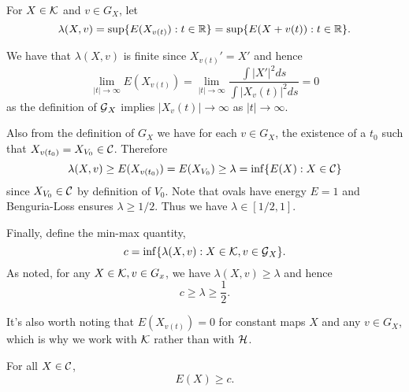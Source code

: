 \documentclass[12pt]{article}
\begin{document}
For \(X \in \operatorname{\mathcal{K}}\) and \(v \in G_X\), let
\[
\lambda(X, v) = \sup \lbrace E(X_{v(t)}) : t \in \operatorname{\mathbb{R}} \rbrace = \sup \lbrace E(X + v(t)) : t \in \operatorname{\mathbb{R}} \rbrace.
\]

We have that \(\lambda(X, v)\) is finite since \(X_{v(t)}' = X'\) and hence
\[
\lim_{|t| \to \infty} E(X_{v(t)}) = \lim_{|t| \to \infty} \frac{\int |X'|^2 ds}{\int |X_v(t)|^2 ds} = 0
\]
as the definition of \(\operatorname{\mathcal{G}}_X\) implies \(|X_v(t)| \to \infty\) as \(|t| \to \infty\).

Also from the definition of \(G_X\) we have for each \(v \in G_X\), the existence of a \(t_0\) such that \(X_{v(t_0)} = X_{V_0} \in \operatorname{\mathcal{C}}\). Therefore
\[
\lambda(X, v) \geq E(X_{v(t_0)}) = E(X_{V_0}) \geq \lambda = \inf\lbrace E(X) : X \in \operatorname{\mathcal{C}}\rbrace
\]
since \(X_{V_0} \in \operatorname{\mathcal{C}}\) by definition of \(V_0\). Note that ovals have energy \(E = 1\) and Benguria-Loss ensures \(\lambda \geq 1/2\). Thus we have \(\lambda \in [1/2, 1]\).

Finally, define the min-max quantity,
\[
c = \inf \lbrace \lambda(X, v) : X \in \operatorname{\mathcal{K}}, v \in \operatorname{\mathcal{G}}_X \rbrace.
\]
As noted, for any \(X \in \operatorname{\mathcal{K}}, v \in G_x\), we have \(\lambda(X, v) \geq \lambda\) and hence
\[
c \geq \lambda \geq \frac{1}{2}.
\]

It's also worth noting that \(E(X_{v(t)}) = 0\) for constant maps \(X\) and any \(v \in G_X\), which is why we work with \(\operatorname{\mathcal{K}}\) rather than with \(\operatorname{\mathcal{H}}\).

\begin{lemma}
\label{lem:E_bounded_by_c}
For all \(X \in \operatorname{\mathcal{C}}\),
\[
E(X) \geq c.
\]
\end{lemma}
\end{document}
